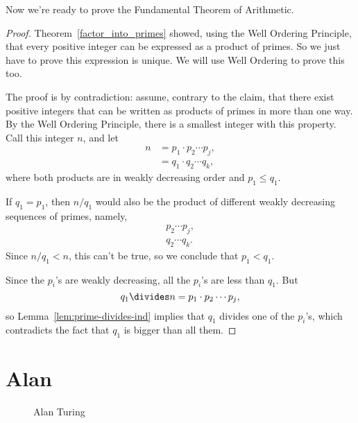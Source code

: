 Now we're ready to prove the Fundamental Theorem of Arithmetic.
\begin{proof}
Theorem~\ref{factor_into_primes} showed, using the Well Ordering
Principle, that every positive integer can be expressed as a product
of primes.  So we just have to prove this expression is unique.  We
will use Well Ordering to prove this too.

The proof is by contradiction: assume, contrary to the claim, that
there exist positive integers that can be written as products of
primes in more than one way.  By the Well Ordering Principle, there is
a smallest integer with this property.  Call this integer $n$, and let
\begin{align*}
n & = p_1 \cdot p_2 \cdots p_j, \\
& = q_1 \cdot q_2 \cdots q_k,
\end{align*}
where both products are in weakly decreasing order and $p_1 \le q_1$.

If $q_1 = p_1$, then $n/q_1$ would also be the product of different
weakly decreasing sequences of primes, namely,
\begin{align*}
 p_2 \cdots p_j, \\
q_2 \cdots q_k.
\end{align*}
Since $n/q_1 < n$, this can't be true, so we conclude that $p_1 <
q_1$.

Since the $p_i$'s are weakly decreasing, all the $p_i$'s are less than
$q_1$.  But
\[
q_1\divides n= p_1 \cdot p_2 \cdots p_j,
\]
so Lemma~\ref{lem:prime-divides-ind} implies that $q_1$ divides one of
the $p_i$'s, which contradicts the fact that $q_1$ is bigger than all
them.
\end{proof}

\begin{problems}
\practiceproblems
{}

\classproblems
{}

\homeworkproblems
{}

\end{problems}

\section{Alan }\label{Turing_sec}

\begin{figure}\redrawntrue
{}
\caption{Alan Turing}
\label{fig:Turing}
\end{figure}

